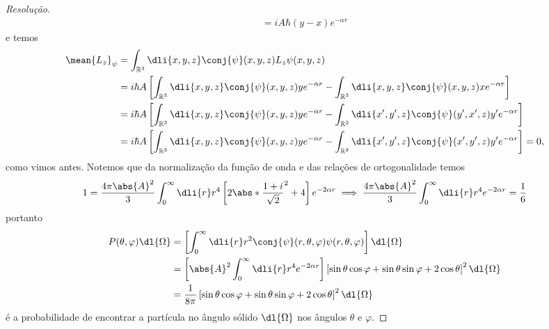 \begin{proof}[Resolução]
\begin{align*}
                        = i A \hbar (y - x)  e^{- \alpha r}
    \end{align*}
    e temos
    \begin{align*}
        \mean{L_z}_{\psi} &= \int_{\mathbb{R}^3} \dli{x,y,z} \conj{\psi}(x,y,z) L_z \psi(x,y,z)\\
                          &= i\hbar A\left[\int_{\mathbb{R}^3} \dli{x,y,z} \conj{\psi}(x,y,z)y e^{-\alpha r} - \int_{\mathbb{R}^3} \dli{x,y,z} \conj{\psi}(x,y,z) x e^{-\alpha r}\right]\\
                          &= i\hbar A\left[\int_{\mathbb{R}^3} \dli{x,y,z} \conj{\psi}(x,y,z)y e^{-\alpha r} - \int_{\mathbb{R}^3} \dli{x',y',z} \conj{\psi}(y',x',z) y' e^{-\alpha r}\right]\\
                          &= i\hbar A\left[\int_{\mathbb{R}^3} \dli{x,y,z} \conj{\psi}(x,y,z)y e^{-\alpha r} - \int_{\mathbb{R}^3} \dli{x',y',z} \conj{\psi}(x',y',z) y' e^{-\alpha r}\right] = 0,
    \end{align*}
    como vimos antes. Notemos que da normalização da função de onda e das relações de ortogonalidade temos
    \begin{equation*}
        1 = \frac{4\pi\abs{A}^2}{3}\int_0^\infty \dli{r} r^4 \left[2\abs*{\frac{1 + i}{\sqrt{2}}}^2 + 4\right] e^{-2 \alpha r} \implies \frac{4\pi\abs{A}^2}{3}\int_0^\infty \dli{r} r^4 e^{-2 \alpha r} = \frac{1}{6}
    \end{equation*}
    portanto
    \begin{align*}
        P(\theta,\varphi)\dl{\Omega} &= \left[\int_0^\infty \dli{r} r^2 \conj{\psi}(r,\theta,\varphi) \psi(r,\theta,\varphi)\right] \dl{\Omega}\\
                                     &= \left[\abs{A}^2 \int_0^\infty \dli{r}r^4 e^{-2 \alpha r}\right] \left[\sin\theta \cos\varphi + \sin\theta \sin\varphi + 2\cos\theta\right]^2 \dl{\Omega}\\
                                     &= \frac{1}{8\pi} \left[\sin\theta \cos\varphi + \sin\theta \sin\varphi + 2\cos\theta\right]^2 \dl{\Omega}
    \end{align*}
    é a probabilidade de encontrar a partícula no ângulo sólido \(\dl{\Omega}\) nos ângulos \(\theta\) e \(\varphi\).


\end{proof}
